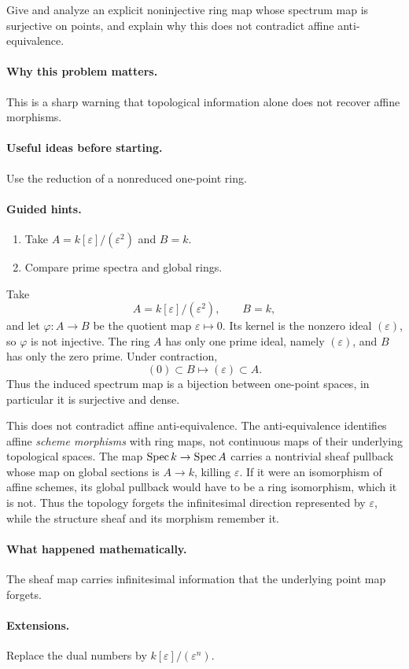 \begin{problem}\label{prob:vi19-p14}
Give and analyze an explicit noninjective ring map whose spectrum map is surjective on points, and explain why this does not contradict affine anti-equivalence.
\end{problem}

\ifdefined\FullProblemDossiers
\paragraph{Why this problem matters.}
This is a sharp warning that topological information alone does not recover affine morphisms.

\paragraph{Useful ideas before starting.}
Use the reduction of a nonreduced one-point ring.

\paragraph{Guided hints.}
\begin{enumerate}
\item Take $A=k[\varepsilon]/(\varepsilon^2)$ and $B=k$.
\item Compare prime spectra and global rings.
\end{enumerate}

\begin{solution}
Take
\[
A=k[\varepsilon]/(\varepsilon^2),
\qquad
B=k,
\]
and let \(\varphi:A\to B\) be the quotient map \(\varepsilon\mapsto0\).  Its kernel is the nonzero ideal \((\varepsilon)\), so \(\varphi\) is not injective.  The ring \(A\) has only one prime ideal, namely \((\varepsilon)\), and \(B\) has only the zero prime.  Under contraction,
\[
(0)\subset B\longmapsto(\varepsilon)\subset A.
\]
Thus the induced spectrum map is a bijection between one-point spaces, in particular it is surjective and dense.

This does not contradict affine anti-equivalence.  The anti-equivalence identifies affine \emph{scheme morphisms} with ring maps, not continuous maps of their underlying topological spaces.  The map \(\operatorname{Spec} k\to\operatorname{Spec} A\) carries a nontrivial sheaf pullback whose map on global sections is \(A\to k\), killing \(\varepsilon\).  If it were an isomorphism of affine schemes, its global pullback would have to be a ring isomorphism, which it is not.  Thus the topology forgets the infinitesimal direction represented by \(\varepsilon\), while the structure sheaf and its morphism remember it.
\end{solution}

\paragraph{What happened mathematically.}
The sheaf map carries infinitesimal information that the underlying point map forgets.

\paragraph{Extensions.}
Replace the dual numbers by $k[\varepsilon]/(\varepsilon^n)$.
\fi
